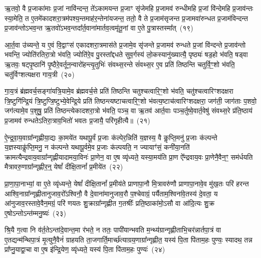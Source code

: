 {\anuvakamend[{प्रा॒जा॒प॒त्यो वा ए॒ष य॒ज्ञो यद्द॑शरा॒त्रस्त्रि॑क॒कुद्वा ए॒ता वै जा॑यत॒ एक॑त्रिꣳशच्च}]}%

ऋ॒तवो॒ वै प्र॒जाका॑माः प्र॒जां नावि॑न्दन्त॒ ते॑\-ऽकामयन्त प्र॒जाꣳ सृ॑जेमहि प्र॒जामव॑ रुन्धीमहि प्र॒जां वि॑न्देमहि प्र॒जाव॑न्तः स्या॒मेति॒ त ए॒तमे॑कादशरा॒त्रम॑पश्य॒न्तमाह॑र॒न्तेना॑यजन्त॒ ततो॒ वै ते प्र॒जाम॑सृजन्त प्र॒जामवा॑रुन्धत प्र॒जाम॑विन्दन्त प्र॒जाव॑न्तो\-ऽभव॒न्त ऋ॒तवो॑\-ऽभव॒न्तदा᳚र्त॒वाना॑मार्तव॒त्वमृ॑तू॒नां वा ए॒ते पु॒त्रास्तस्मा᳚त्~(१९)

आ॒र्त॒वा उ॑च्यन्ते॒ य ए॒वं वि॒द्वाꣳस॑ एकादशरा॒त्रमास॑ते प्र॒जामे॒व सृ॑जन्ते प्र॒जामव॑ रुन्धते प्र॒जां वि॑न्दन्ते प्र॒जाव॑न्तो भवन्ति॒ ज्योति॑रतिरा॒त्रो भ॑वति॒ ज्योति॑रे॒व पु॒रस्ता᳚द्दधते सुव॒र्गस्य॑ लो॒कस्यानु॑ख्यात्यै॒ पृष्ठ्यः॑ षड॒हो भ॑वति॒ षड्वा ऋ॒तवः॒ षट्पृ॒ष्ठानि॑ पृ॒ष्ठैरे॒वर्तून॒न्वारो॑हन्त्यृ॒तुभिः॑ संवथ्स॒रन्ते सं॑वथ्स॒र ए॒व प्रति॑ तिष्ठन्ति चतुर्वि॒ꣳ॒शो भ॑वति॒ चतु॑र्विꣳशत्यक्षरा गाय॒त्री~(२०)

गा॒य॒त्रं ब्र॑ह्मवर्च॒सङ्गा॑यत्रि॒यामे॒व ब्र॑ह्मवर्च॒से प्रति॑ तिष्ठन्ति चतुश्चत्वारि॒ꣳ॒शो भ॑वति॒ चतु॑श्चत्वारिꣳशद\-क्षरा त्रि॒ष्टुगि॑न्द्रि॒यं त्रि॒ष्टुप्त्रि॒ष्टुभ्ये॒वेन्द्रि॒ये प्रति॑ तिष्ठन्त्यष्टाचत्वारि॒ꣳ॒शो भ॑वत्य॒ष्टाच॑त्वारिꣳशद\-क्षरा॒ जग॑ती॒ जाग॑ताः प॒शवो॒ जग॑त्यामे॒व प॒शुषु॒ प्रति॑ तिष्ठन्त्येकादशरा॒त्रो भ॑वति॒ पञ्च॒ वा ऋ॒तव॑ आर्त॒वाः पञ्च॒र्तुष्वे॒वार्त॒वेषु॑ संवथ्स॒रे प्र॑ति॒ष्ठाय॑ प्र॒जामव॑ रुन्धते\-ऽतिरा॒त्राव॒भितो॑ भवतः प्र॒जायै॒ परि॑गृहीत्यै॥~(२१)

{\anuvakamend[{तस्मा᳚द्गाय॒त्र्येका॒न्नप॑ञ्चा॒शच्च॑}]}%

ऐ॒न्द्र॒वा॒य॒वाग्रा᳚न्गृह्णीया॒द्यः का॒मये॑त यथापू॒र्वं प्र॒जाः क॑ल्पेर॒न्निति॑ य॒ज्ञस्य॒ वै कॢप्ति॒मनु॑ प्र॒जाः क॑ल्पन्ते य॒ज्ञस्याकॢ॑प्ति॒मनु॒ न क॑ल्पन्ते यथापू॒र्वमे॒व प्र॒जाः क॑ल्पयति॒ न ज्यायाꣳ॑सं॒ कनी॑या॒नति॑ क्रामत्यैन्द्रवाय॒वाग्रा᳚न्गृह्णीयादामया॒विनः॑ प्रा॒णेन॒ वा ए॒ष व्यृ॑ध्यते॒ यस्या॒मय॑ति प्रा॒ण ऐ᳚न्द्रवाय॒वः प्रा॒णेनै॒वैन॒ꣳ॒ सम॑र्धयति मैत्रावरु॒णाग्रा᳚न्गृह्णीर॒न्॒ येषां᳚ दीक्षि॒तानां᳚ प्र॒मीये॑त~(२२)

प्रा॒णा॒पा॒नाभ्यां॒ वा ए॒ते व्यृ॑ध्यन्ते॒ येषां᳚ दीक्षि॒तानां᳚ प्र॒मीय॑ते प्राणापा॒नौ मि॒त्रावरु॑णौ प्राणापा॒नावे॒व मु॑ख॒तः परि॑ हरन्त आश्वि॒नाग्रा᳚न्गृह्णीतानुजाव॒रो᳚\-ऽश्विनौ॒ वै दे॒वाना॑मानुजाव॒रौ प॒श्चेवाग्रं॒ पर्यैताम॒श्विना॑वे॒तस्य॑ दे॒वता॒ य आ॑नुजाव॒रस्तावे॒वैन॒मग्रं॒ परि॑ णयतः शु॒क्राग्रा᳚न्गृह्णीत ग॒तश्रीः᳚ प्रति॒ष्ठाका॑मो॒\-ऽसौ वा आ॑दि॒त्यः शु॒क्र ए॒षो\-ऽन्तो\-ऽन्त॑म्मनु॒ष्यः॑~(२३)

श्रि॒यै ग॒त्वा नि व॑र्त॒ते\-ऽन्ता॑दे॒वान्त॒मा र॑भते॒ न ततः॒ पापी॑यान्भवति म॒न्थ्य॑ग्रान्गृह्णीताभि॒चर॑न्नार्तपा॒त्रं वा ए॒तद्यन्म॑न्थिपा॒त्रं मृ॒त्युनै॒वैनं॑ ग्राहयति ता॒जगार्ति॒मार्च्छ॑त्याग्रय॒णाग्रा᳚न्गृह्णीत॒ यस्य॑ पि॒ता पि॑ताम॒हः पुण्यः॒ स्यादथ॒ तन्न प्रा᳚प्नु॒याद्वा॒चा वा ए॒ष इ॑न्द्रि॒येण॒ व्यृ॑ध्यते॒ यस्य॑ पि॒ता पि॑ताम॒हः पुण्यः॑~(२४)

